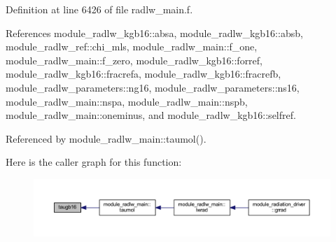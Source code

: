 Definition at line 6426 of file radlw\+\_\+main.\+f.



References module\+\_\+radlw\+\_\+kgb16\+::absa, module\+\_\+radlw\+\_\+kgb16\+::absb, module\+\_\+radlw\+\_\+ref\+::chi\+\_\+mls, module\+\_\+radlw\+\_\+main\+::f\+\_\+one, module\+\_\+radlw\+\_\+main\+::f\+\_\+zero, module\+\_\+radlw\+\_\+kgb16\+::forref, module\+\_\+radlw\+\_\+kgb16\+::fracrefa, module\+\_\+radlw\+\_\+kgb16\+::fracrefb, module\+\_\+radlw\+\_\+parameters\+::ng16, module\+\_\+radlw\+\_\+parameters\+::ns16, module\+\_\+radlw\+\_\+main\+::nspa, module\+\_\+radlw\+\_\+main\+::nspb, module\+\_\+radlw\+\_\+main\+::oneminus, and module\+\_\+radlw\+\_\+kgb16\+::selfref.



Referenced by module\+\_\+radlw\+\_\+main\+::taumol().



Here is the caller graph for this function\+:
\nopagebreak
\begin{figure}[H]
\begin{center}
\leavevmode
\includegraphics[width=350pt]{radlw__main_8f_a942ce0031745cd1b3b4ebc3915970554_icgraph}
\end{center}
\end{figure}


